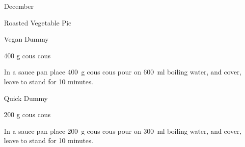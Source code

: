 \begin{menu}{December}
\begin{recipe}{2}{Roasted Vegetable Pie}
\begin{instructions}
    \end{instructions}
    \end{recipe}%
  
    \begin{recipe}{2}{Vegan Dummy}%
		\begin{ingredients}
		400 g cous cous  \\
	
		\end{ingredients}
	
	
    \begin{instructions}
    \item 
    In a
    sauce pan 
    place
    400~g  cous cous
    pour on
    600~ml  boiling water,
    and cover, leave to stand for 10 minutes.
  
    \end{instructions}
    \end{recipe}%
  
    \begin{recipe}{1}{Quick Dummy}%
		\begin{ingredients}
		200 g cous cous  \\
	
		\end{ingredients}
	
	
    \begin{instructions}
    \item 
    In a
    sauce pan 
    place
    200~g  cous cous
    pour on
    300~ml  boiling water,
    and cover, leave to stand for 10 minutes.
  
    \end{instructions}
    \end{recipe}%
  
    \clearpage
    \end{menu}
	
	